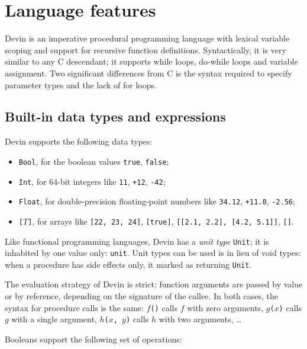 \documentclass[11pt, american, draft]{PhdThesis}
\begin{document}
  \section{Language features}

  Devin is an imperative procedural programming language with lexical variable scoping and support
  for recursive function definitions. Syntactically, it is very similar to any C descendant; it
  supports while loops, do-while loops and variable assignment. Two significant differences from C
  is the syntax required to specify parameter types and the lack of for loops.

  \subsection{Built-in data types and expressions}

  Devin supports the following data types:

  \begin{itemize}[noitemsep,topsep=0pt]
    \item \verb$Bool$, for the boolean values \verb$true$, \verb$false$;

    \item \verb$Int$, for 64-bit integers like \verb$11$, \verb$+12$, \verb$-42$;

    \item \verb$Float$, for double-precision floating-point numbers like \verb$34.12$, \verb$+11.0$,
          \verb$-2.56$;

    \item \mbox{\texttt{[$T$]}}, for arrays like \verb$[22, 23, 24]$, \verb$[true]$,
          \verb$[[2.1, 2.2], [4.2, 5.1]]$, \verb$[]$.
  \end{itemize}

  Like functional programming languages, Devin has a \emph{unit type} \verb$Unit$; it is inhabited
  by one value only: \verb$unit$. Unit types can be used is in lieu of void types: when a
  procedure has side effects only, it marked as returning \verb$Unit$.

  The evaluation strategy of Devin is strict; function arguments are passed by value or by
  reference, depending on the signature of the callee. In both cases, the syntax for procedure
  calls is the same: \mbox{\texttt{$f$()}} calls $f$ with zero arguments, \mbox{\texttt{$g$($x$)}}
  calls $g$ with a single argument, \mbox{\texttt{$h$($x$, $y$)}} calls $h$ with two
  arguments, \ldots

  Booleans support the following set of operations:
\end{document}
